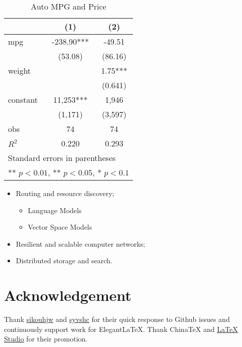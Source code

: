 \documentclass[en,hazy,blue,screen,14pt]{elegantnote}
\begin{document}
\begin{table}[htbp]
  \small
  \centering
  \caption{Auto MPG and Price \label{tab:reg}}
    \begin{tabular}{lcc}
    \toprule
                    &       (1)         &        (2)      \\
    \midrule
    mpg             &    -238.90***     &      -49.51     \\
                    &     (53.08)       &      (86.16)    \\
    weight          &                   &      1.75***    \\
                    &                   &      (0.641)    \\
    constant        &     11,253***     &       1,946     \\
                    &     (1,171)       &      (3,597)   \\
    obs             &        74         &         74     \\
    $R^2$           &      0.220        &       0.293    \\
    \bottomrule
    \multicolumn{3}{l}{\scriptsize Standard errors in parentheses} \\
    \multicolumn{3}{l}{\scriptsize *** $p<0.01$, ** $p<0.05$, * $p<0.1$} \\
    \end{tabular}%
\end{table}%


\begin{itemize}[noitemsep]
  \item Routing and resource discovery;
    \begin{itemize} 
      \item Language Models
      \item Vector Space Models
    \end{itemize}
  \item Resilient and scalable computer networks;
  \item Distributed storage and search.
\end{itemize}


\section{Acknowledgement}

Thank \href{https://github.com/sikouhjw}{sikouhjw} and \href{https://github.com/syvshc}{syvshc} for their quick response to Github issues and continuously support work for Elegant\LaTeX{}. Thank China\TeX{} and \href{http://www.latexstudio.net/}{LaTeX Studio} for their promotion. 
\end{document}
